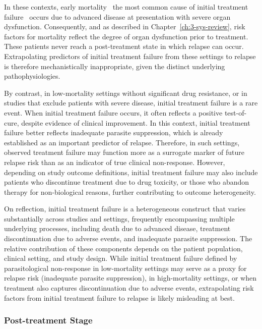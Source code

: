 In these contexts, early mortality \textemdash\ the most common cause of initial treatment failure \textemdash\ occurs due to advanced disease at presentation with severe organ dysfunction. Consequently, and as described in Chapter~\ref{ch:3-sys-review}, risk factors for mortality reflect the degree of organ dysfunction prior to treatment. These patients never reach a post-treatment state in which relapse can occur. Extrapolating predictors of initial treatment failure from these settings to relapse is therefore mechanistically inappropriate, given the distinct underlying pathophysiologies.

By contrast, in low-mortality settings without significant drug resistance, or in studies that exclude patients with severe disease, initial treatment failure is a rare event. When initial treatment failure occurs, it often reflects a positive test-of-cure, despite evidence of clinical improvement\cite{sundar2012,musa2023}. In this context, initial treatment failure better reflects inadequate parasite suppression, which is already established as an important predictor of relapse\cite{sudarshan2011,verrest2021,verrest2024}. Therefore, in such settings, observed treatment failure may function more as a surrogate marker of future relapse risk than as an indicator of true clinical non-response. However, depending on study outcome definitions, initial treatment failure may also include patients who discontinue treatment due to drug toxicity, or those who abandon therapy for non-biological reasons, further contributing to outcome heterogeneity.

On reflection, initial treatment failure is a heterogeneous construct that varies substantially across studies and settings, frequently encompassing multiple underlying processes, including death due to advanced disease, treatment discontinuation due to adverse events, and inadequate parasite suppression. The relative contribution of these components depends on the patient population, clinical setting, and study design. While initial treatment failure defined by parasitological non-response in low-mortality settings may serve as a proxy for relapse risk (inadequate parasite suppression), in high-mortality settings, or when treatment also captures discontinuation due to adverse events, extrapolating risk factors from initial treatment failure to relapse is likely misleading at best.

\subsubsection{Post-treatment Stage}

